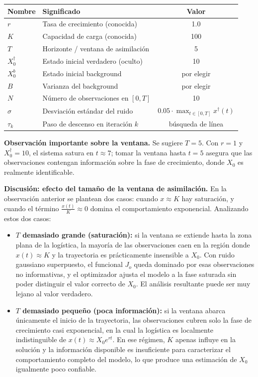 \documentclass[12pt,spanish,mexico]{article}
\numberwithin{equation}{section}
\theoremstyle{definition}
\theoremstyle{remark}
\begin{document}
\begin{table}[H]
\centering
\begin{tabular}{|l|l|c|}
\hline
Nombre & Significado & Valor \\
\hline
\(r\) & Tasa de crecimiento (conocida) & 1.0 \\
\(K\) & Capacidad de carga (conocida) & 100 \\
\(T\) & Horizonte / ventana de asimilación & 5 \\
\(X_0^{\dagger}\) & Estado inicial verdadero (oculto) & 10 \\
\(X_0^{b}\) & Estado inicial background & por elegir \\
\(B\) & Varianza del background & por elegir \\
\(N\) & Número de observaciones en \([0, T]\) & 10 \\
\(\sigma\) & Desviación estándar del ruido & \(0.05 \cdot \max_{t\in[0,T]} x^{\dagger}(t)\) \\
\(\tau_k\) & Paso de descenso en iteración \(k\) & búsqueda de línea \\
\hline
\end{tabular}
\end{table}

\textbf{Observación importante sobre la ventana.} Se sugiere \(T = 5\). Con \(r = 1\) y \(X_0^{\dagger} = 10\), el sistema satura en \(t \approx 7\); tomar la ventana hasta \(t = 5\) asegura que las observaciones contengan información sobre la fase de crecimiento, donde \(X_0\) es realmente identificable. 

\textbf{Discusión: efecto del tamaño de la ventana de asimilación.}
En la observación anterior se plantean dos casos: cuando $x \approx K$ hay
saturación, y cuando el término $\frac{x(t)}{K} \approx 0$ domina el
comportamiento exponencial. Analizando estos dos casos:

\begin{itemize}
    \item \textbf{$T$ demasiado grande (saturación):} si la ventana se
    extiende hasta la zona plana de la logística, la mayoría de las
    observaciones caen en la región donde $x(t) \approx K$ y la
    trayectoria es prácticamente insensible a $X_0$. Con ruido gaussiano
    superpuesto, el funcional $J_o$ queda dominado por esas observaciones
    no informativas, y el optimizador ajusta el modelo a la fase saturada
    sin poder distinguir el valor correcto de $X_0$. El análisis resultante
    puede ser muy lejano al valor verdadero.

    \item \textbf{$T$ demasiado pequeño (poca información):} si la ventana
    abarca únicamente el inicio de la trayectoria, las observaciones cubren
    solo la fase de crecimiento casi exponencial, en la cual la logística
    es localmente indistinguible de $x(t) \approx X_0 e^{rt}$. En ese
    régimen, $K$ apenas influye en la solución y la información disponible
    es insuficiente para caracterizar el comportamiento completo del modelo,
    lo que produce una estimación de $X_0$ igualmente poco confiable.
\end{itemize}
\end{document}
